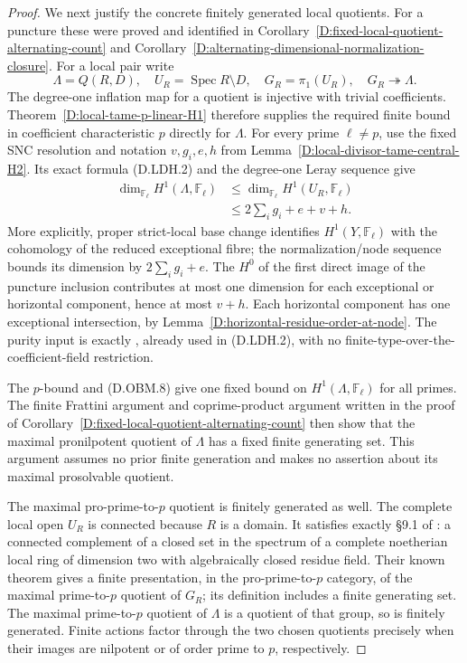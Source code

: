 \begin{proof}
We next justify the concrete finitely generated local
quotients. For a puncture these were proved and identified
in Corollary~\ref{D:fixed-local-quotient-alternating-count}
and Corollary~\ref{D:alternating-dimensional-normalization-closure}.
For a local pair write
\[
  \Lambda=Q(R,D),\quad
  U_R=\operatorname{Spec}R\setminus D,\quad
  G_R=\pi_1(U_R),\quad G_R\twoheadrightarrow\Lambda.
                                                        \tag{D.OBM.7}
\]
The degree-one inflation map for a quotient is injective
with trivial coefficients. Theorem~\ref{D:local-tame-p-linear-H1}
therefore supplies the required finite bound in
coefficient characteristic $p$ directly for $\Lambda$.
For every prime $\ell\ne p$, use the fixed SNC resolution
and notation $v,g_i,e,h$ from
Lemma~\ref{D:local-divisor-tame-central-H2}.
Its exact formula (D.LDH.2) and the degree-one Leray
sequence give
\[
 \begin{split}
 \dim_{\mathbb F_\ell}H^1(\Lambda,\mathbb F_\ell)
 &\le\dim_{\mathbb F_\ell}H^1(U_R,\mathbb F_\ell)\\
 &\le 2\sum_i g_i+e+v+h.                                
 \end{split}                                             \tag{D.OBM.8}
\]
More explicitly, proper strict-local base change identifies
$H^1(Y,\mathbb F_\ell)$ with the cohomology of the reduced
exceptional fibre; the normalization/node sequence bounds
its dimension by $2\sum_i g_i+e$. The $H^0$ of the first
direct image of the puncture inclusion contributes at
most one dimension for each exceptional or horizontal
component, hence at most $v+h$. Each horizontal component
has one exceptional intersection, by
Lemma~\ref{D:horizontal-residue-order-at-node}.
The purity input is exactly
\citet[Expose~XVI, Theorem~3.1.1 and Corollary~3.1.3,
pp.~242--243]{A_ILO2014}, already used in (D.LDH.2), with
no finite-type-over-the-coefficient-field restriction.

The $p$-bound and (D.OBM.8) give one fixed bound on
$H^1(\Lambda,\mathbb F_\ell)$ for all primes. The finite
Frattini argument and coprime-product argument written
in the proof of
Corollary~\ref{D:fixed-local-quotient-alternating-count}
then show that the maximal pronilpotent quotient of
$\Lambda$ has a fixed finite generating set. This
argument assumes no prior finite generation and makes
no assertion about its maximal prosolvable quotient.

The maximal pro-prime-to-$p$ quotient is finitely
generated as well. The complete local open $U_R$ is
connected because $R$ is a domain. It satisfies exactly
\S9.1 of \citet[Theorem~9.2, pp.~122--123]
{C_GrothendieckMurre1971PrimeToP}: a connected complement
of a closed set in the spectrum of a complete
noetherian local ring of dimension two with algebraically
closed residue field. Their known theorem gives a
finite presentation, in the pro-prime-to-$p$ category,
of the maximal prime-to-$p$ quotient of $G_R$; its
definition includes a finite generating set.
The maximal prime-to-$p$ quotient of $\Lambda$ is a
quotient of that group, so is finitely generated.
Finite actions factor through the two chosen
quotients precisely when their images are nilpotent
or of order prime to $p$, respectively.


\end{proof}
